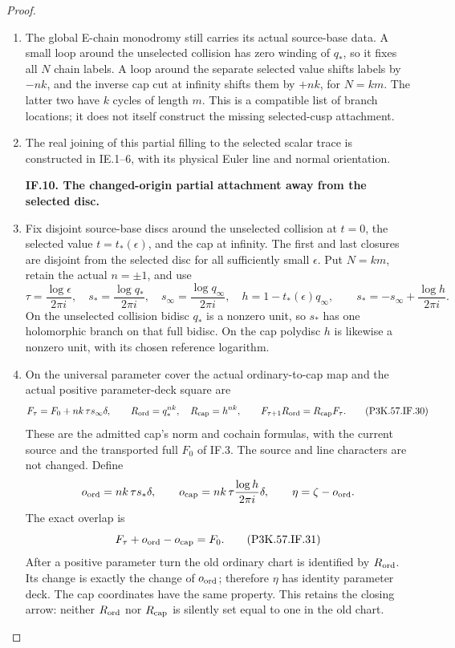 \begin{proof}
\begin{enumerate}[label=\arabic*.]
\item The global E-chain monodromy still carries its actual source-base
data. A small loop around the unselected collision has zero winding
of \(q_*\), so it fixes all \(N\) chain labels. A loop around the
separate selected value shifts labels by \(-nk\), and the inverse
cap cut at infinity shifts them by \(+nk\), for \(N=km\).
The latter two have \(k\) cycles of length \(m\). This is a
compatible list of branch locations; it does not itself construct
the missing selected-cusp attachment.

\item The real joining of this partial filling to the selected scalar trace is
constructed in IE.1--6, with its physical Euler line and normal orientation.

\par\medskip\noindent\textbf{IF.10. The changed-origin partial attachment away from the selected disc.}\par\nopagebreak[4]

\item Fix disjoint source-base discs around the unselected collision at \(t=0\),
the selected value \(t=t_*(\epsilon)\), and the cap at infinity. The first
and last closures are disjoint from the selected disc for all sufficiently
small \(\epsilon\). Put \(N=km\), retain the actual \(n=\pm1\), and use
\[
 \tau=\frac{\log\epsilon}{2\pi i},\quad
 s_*=\frac{\log q_*}{2\pi i},\quad
 s_\infty=\frac{\log q_\infty}{2\pi i},\quad
 h=1-t_*(\epsilon)q_\infty,\qquad
 s_*=-s_\infty+\frac{\log h}{2\pi i}.                   \tag{P3K.57.IF.29}
\]
On the unselected collision bidisc \(q_*\) is a nonzero unit, so \(s_*\)
has one holomorphic branch on that full bidisc. On the cap polydisc \(h\)
is likewise a nonzero unit, with its chosen reference logarithm.

\item On the universal parameter cover the actual ordinary-to-cap map and
the actual positive parameter-deck square are
\[
 F_\tau=F_0+nk\,\tau s_\infty\delta,\qquad
 R_{\rm ord}=q_*^{nk},\quad R_{\rm cap}=h^{nk},\qquad
 F_{\tau+1}R_{\rm ord}=R_{\rm cap}F_\tau.               \tag{P3K.57.IF.30}
\]
These are the admitted cap's norm and cochain formulas, with the current
source and the transported full \(F_0\) of IF.3. The source and line
characters are not changed. Define
\[
 o_{\rm ord}=nk\,\tau s_*\delta,\qquad
 o_{\rm cap}=nk\,\tau\frac{\log h}{2\pi i}\delta,\qquad
 \eta=\zeta-o_{\rm ord}.
\]
The exact overlap is
\[
                F_\tau+o_{\rm ord}-o_{\rm cap}=F_0.    \tag{P3K.57.IF.31}
\]
After a positive parameter turn the old ordinary chart is identified
by \(R_{\rm ord}\). Its change is exactly the change of \(o_{\rm ord}\);
therefore \(\eta\) has identity parameter deck. The cap coordinates
have the same property. This retains the closing arrow: neither
\(R_{\rm ord}\) nor \(R_{\rm cap}\) is silently set equal to one in
the old chart.


\end{enumerate}
\end{proof}
